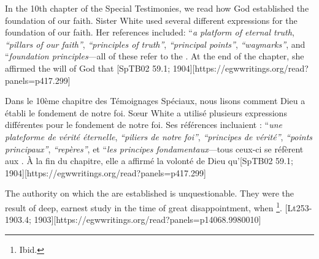  \label{chap:authority}


 \label{chap:authority}


In the 10th chapter of the Special Testimonies, we read how God established the foundation of our faith. Sister White used several different expressions for the foundation of our faith. Her references included: “\textit{a platform of eternal truth}, \textit{“pillars of our faith”}, \textit{“principles of truth”}, \textit{“principal points”}, \textit{“waymarks”}, and “\textit{foundation principles}—all of these refer to the . At the end of the chapter, she affirmed the will of God that [SpTB02 59.1; 1904][https://egwwritings.org/read?panels=p417.299]


Dans le 10ème chapitre des Témoignages Spéciaux, nous lisons comment Dieu a établi le fondement de notre foi. Sœur White a utilisé plusieurs expressions différentes pour le fondement de notre foi. Ses références incluaient : “\textit{une plateforme de vérité éternelle}, \textit{“piliers de notre foi”}, \textit{“principes de vérité”}, \textit{“points principaux”}, \textit{“repères”}, et “\textit{les principes fondamentaux}—tous ceux-ci se réfèrent aux . À la fin du chapitre, elle a affirmé la volonté de Dieu qu’[SpTB02 59.1; 1904][https://egwwritings.org/read?panels=p417.299]


The authority on which the  are established is unquestionable. They were the result of deep, earnest study in the time of great disappointment, when \footnote{Ibid.}. [Lt253-1903.4; 1903][https://egwwritings.org/read?panels=p14068.9980010]


